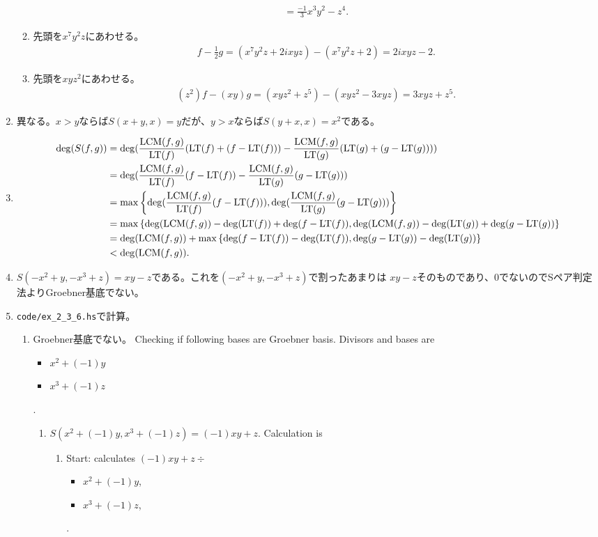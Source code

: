 \documentclass[9pt]{ltjsarticle}
\begin{document}
\begin{enumerate}[label=(問題 \arabic*)]
\begin{enumerate}[label=(\alph*)]
\begin{align}
      =
      \frac{-1}{3}x^3y^2 -z^4.
    \end{align}
    \item 先頭を$x^7y^2z$にあわせる。
    \begin{align}
      f- \frac{1}{2}g =
      (x^7y^2z+2ixyz) - (x^7y^2z + 2)
      =
      2ixyz - 2.
    \end{align}
    \item 先頭を$xyz^2$にあわせる。
    \begin{align}
      (z^2)f - (xy)g
      =
      (xyz^2+z^5) - (xyz^2-3xyz)
      =
      3xyz + z^5.
    \end{align}
  \end{enumerate}
  \item
  異なる。$x>y$ならば$S(x+y,x)=y$だが、$y>x$ならば$S(y+x,x)= x^2$である。
  \item
  \begin{align}
    \deg(S(f,g))
    &=
    \deg(\frac{\mathrm{LCM}(f,g)}{{\rm LT}(f)}({\rm LT}(f)+(f-{\rm LT}(f))) - \frac{\mathrm{LCM}(f,g)}{{\rm LT}(g)}({\rm LT}(g)+(g-{\rm LT}(g))))\\
    &=
    \deg(\frac{\mathrm{LCM}(f,g)}{{\rm LT}(f)}(f-{\rm LT}(f)) - \frac{\mathrm{LCM}(f,g)}{{\rm LT}(g)}(g-{\rm LT}(g)))\\
    &=
    \max\left\{\deg(\frac{\mathrm{LCM}(f,g)}{{\rm LT}(f)}(f-{\rm LT}(f))), \deg(\frac{\mathrm{LCM}(f,g)}{{\rm LT}(g)}(g-{\rm LT}(g)))\right\}\\
    &=
    \max\left\{\deg(\mathrm{LCM}(f,g))-\deg({\rm LT}(f))+\deg(f-{\rm LT}(f)),
    \deg(\mathrm{LCM}(f,g))-\deg({\rm LT}(g))+\deg(g-{\rm LT}(g))\right\}\\
    &=
    \deg(\mathrm{LCM}(f,g)) + \max\left\{\deg(f-{\rm LT}(f))-\deg({\rm LT}(f)), \deg(g-{\rm LT}(g))-\deg({\rm LT}(g))\right\}\\
    &<
    \deg(\mathrm{LCM}(f,g)).
  \end{align}
  \item
  $S(-x^2+y,-x^3+z) = xy-z$である。これを$(-x^2+y,-x^3+z)$で割ったあまりは
  $xy-z$そのものであり、0でないのでSペア判定法よりGroebner基底でない。
  \item   {\tt code/ex_2_3_6.hs}で計算。
  \begin{enumerate}[label=(\alph*)]
    \item
      Groebner基底でない。
      Checking if following bases are Groebner basis.
      Divisors and bases are
      \begin{itemize}
      \item $x^{2}+(-1)y$\item $x^{3}+(-1)z$\end{itemize} .
      \begin{enumerate}
      \item $S(x^{2}+(-1)y, x^{3}+(-1)z) = (-1)xy+z$.  Calculation is \begin{enumerate}
      \item Start: calculates $(-1)xy+z\div $\begin{itemize}
      \item $x^{2}+(-1)y$,
      \item $x^{3}+(-1)z$,
      \end{itemize} .


\end{enumerate}
\end{enumerate}
\end{enumerate}
\end{enumerate}
\end{document}
